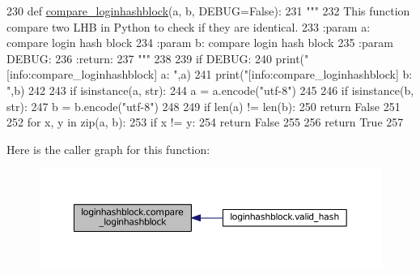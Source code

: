 \begin{DoxyCode}
230 \textcolor{keyword}{def }\hyperlink{namespaceloginhashblock_ac24dd842eb90e0ede55e842d44148d5b}{compare\_loginhashblock}(a, b, DEBUG=False):
231     \textcolor{stringliteral}{"""}
232 \textcolor{stringliteral}{    This function compare two LHB in Python to check if they are identical.}
233 \textcolor{stringliteral}{    :param a: compare login hash block}
234 \textcolor{stringliteral}{    :param b: compare login hash block}
235 \textcolor{stringliteral}{    :param DEBUG:}
236 \textcolor{stringliteral}{    :return:}
237 \textcolor{stringliteral}{    """}
238 
239     \textcolor{keywordflow}{if} DEBUG:
240         print(\textcolor{stringliteral}{"[info:compare\_loginhashblock] a: "},a)
241         print(\textcolor{stringliteral}{"[info:compare\_loginhashblock] b: "},b)
242 
243     \textcolor{keywordflow}{if} isinstance(a, str):
244         a = a.encode(\textcolor{stringliteral}{"utf-8"})
245 
246     \textcolor{keywordflow}{if} isinstance(b, str):
247         b = b.encode(\textcolor{stringliteral}{"utf-8"})
248 
249     \textcolor{keywordflow}{if} len(a) != len(b):
250         \textcolor{keywordflow}{return} \textcolor{keyword}{False}
251 
252     \textcolor{keywordflow}{for} x, y \textcolor{keywordflow}{in} zip(a, b):
253         \textcolor{keywordflow}{if} x != y:
254             \textcolor{keywordflow}{return} \textcolor{keyword}{False}
255 
256     \textcolor{keywordflow}{return} \textcolor{keyword}{True}
257 
\end{DoxyCode}


Here is the caller graph for this function\+:\nopagebreak
\begin{figure}[H]
\begin{center}
\leavevmode
\includegraphics[width=350pt]{namespaceloginhashblock_ac24dd842eb90e0ede55e842d44148d5b_icgraph}
\end{center}
\end{figure}


